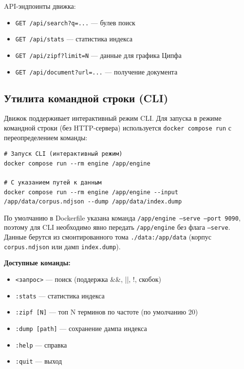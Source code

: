 API-эндпоинты движка:
\begin{itemize}
    \item \texttt{GET /api/search?q=...} --- булев поиск
    \item \texttt{GET /api/stats} --- статистика индекса
    \item \texttt{GET /api/zipf?limit=N} --- данные для графика Ципфа
    \item \texttt{GET /api/document?url=...} --- получение документа
\end{itemize}

\subsection{Утилита командной строки (CLI)}

Движок поддерживает интерактивный режим CLI. Для запуска в режиме командной строки (без HTTP-сервера) используется \texttt{docker compose run} с переопределением команды:

\begin{verbatim}
# Запуск CLI (интерактивный режим)
docker compose run --rm engine /app/engine

# С указанием путей к данным
docker compose run --rm engine /app/engine --input /app/data/corpus.ndjson --dump /app/data/index.dump
\end{verbatim}

По умолчанию в Dockerfile указана команда \texttt{/app/engine --serve --port 9090}, поэтому для CLI необходимо явно передать \texttt{/app/engine} без флага \texttt{--serve}. Данные берутся из смонтированного тома \texttt{./data:/app/data} (корпус \texttt{corpus.ndjson} или дамп \texttt{index.dump}).

\textbf{Доступные команды:}
\begin{itemize}
    \item \texttt{<запрос>} --- поиск (поддержка \&\&, ||, !, скобок)
    \item \texttt{:stats} --- статистика индекса
    \item \texttt{:zipf [N]} --- топ N терминов по частоте (по умолчанию 20)
    \item \texttt{:dump [path]} --- сохранение дампа индекса
    \item \texttt{:help} --- справка
    \item \texttt{:quit} --- выход
\end{itemize}

